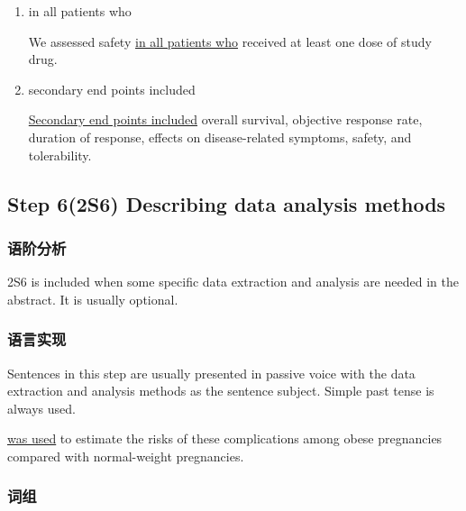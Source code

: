 \documentclass[a4paper]{ctexbook}
\begin{document}
\begin{enumerate}
      \item in all patients who
      \begin{eg}{}
        We assessed safety \uline{in all patients who} received at least one dose of study drug. 
      \end{eg}

      \item secondary end points included
      \begin{eg}{}
        \uline{Secondary end points included} overall survival, objective response rate, duration of response, effects on disease-related symptoms, safety, and tolerability.
      \end{eg}
    \end{enumerate}

  \subsection{Step 6(2S6) Describing data analysis methods}

    \subsubsection{语阶分析}

    2S6 is included when some specific data extraction and analysis are needed in the abstract. It is usually optional.

    \subsubsection{语言实现}

    Sentences in this step are usually presented in passive voice with the data extraction and analysis methods as the sentence subject. Simple past tense is always used.

    \begin{eg}{}
       \uline{was used} to estimate the risks of these complications among obese pregnancies compared with normal-weight pregnancies.    
    \end{eg}

    \subsubsection{词组}
\end{document}
